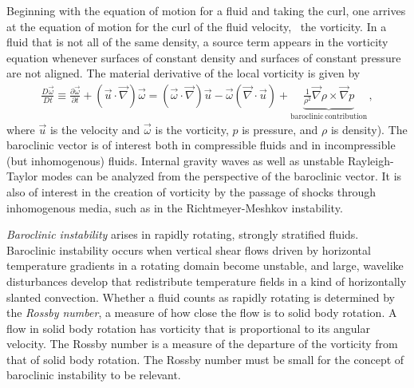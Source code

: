 Beginning with the equation of motion for a fluid and taking the curl,
one arrives at the equation of motion for the curl of the fluid velocity,
\ie\ the vorticity. In a fluid that is not all of the same density, a
source term appears in the vorticity equation whenever surfaces of
constant density and surfaces of constant pressure are not aligned. The
material derivative of the local vorticity is given by
\begin{align}
\frac{D\vec\omega}{Dt} \equiv \frac{\partial \vec \omega}{\partial t}
 + (\vec{u} \cdot \vec \nabla) \vec \omega
    =
(\vec \omega \cdot \vec \nabla) \vec{u} - \vec \omega (\vec \nabla \cdot \vec{u})
 + \underbrace{\frac{1}{\rho^2}\vec \nabla \rho \times \vec \nabla p
   }_{\mathrm{baroclinic \, contribution}}
\,,
\label{NSvorticEq}
\end{align}
where $\vec{u}$ is the velocity and $\vec \omega$ is the vorticity, $ p $
is pressure, and $ \rho $ is density). The baroclinic vector
 is of interest both in compressible fluids and in
incompressible (but inhomogenous) fluids. Internal gravity waves as well
as unstable Rayleigh-Taylor modes can be analyzed from the perspective of
the baroclinic vector. It is also of interest in the creation of
vorticity by the passage of shocks through inhomogenous media, such as in
the Richtmeyer-Meshkov instability.

\emph{Baroclinic instability} arises in rapidly rotating, strongly
stratified fluids.
Baroclinic instability occurs when vertical shear flows driven by
horizontal temperature gradients in a rotating domain become unstable,
and large, wavelike disturbances develop that redistribute temperature
fields in a kind of horizontally slanted convection.
Whether a fluid counts as rapidly rotating is
determined by the \emph{Rossby number}, a measure of how close the flow
is to solid body rotation. A flow in solid body rotation has vorticity
that is proportional to its angular velocity. The Rossby number is a
measure of the departure of the vorticity from that of solid body
rotation. The Rossby number must be small for the concept of baroclinic
instability to be relevant.

